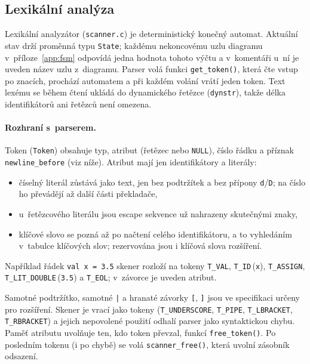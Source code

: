 \subsection{Lexikální analýza}

Lexikální analyzátor (\texttt{scanner.c}) je deterministický konečný automat.
Aktuální stav drží proměnná typu \texttt{State}; každému nekoncovému uzlu
diagramu v~příloze~\ref{app:fsm} odpovídá jedna hodnota tohoto výčtu
a v~komentáři u~ní je uveden název uzlu z~diagramu. Parser volá funkci
\texttt{get\_token()}, která čte vstup po znacích, prochází automatem a při
každém volání vrátí jeden token. Text lexému se během čtení ukládá do
dynamického řetězce (\texttt{dynstr}), takže délka identifikátorů ani
řetězců není omezena.

\paragraph{Rozhraní s~parserem.}
Token (\texttt{Token}) obsahuje typ, atribut (řetězec nebo \texttt{NULL}),
číslo řádku a příznak \texttt{newline\_before} (viz níže). Atribut mají jen
identifikátory a literály:
\begin{itemize}

  \item číselný literál zůstává jako text, jen bez podtržítek a bez přípony
        \texttt{d}/\texttt{D}; na číslo ho převádějí až další části překladače,
  \item u~řetězcového literálu jsou escape sekvence už nahrazeny skutečnými
        znaky,
  \item klíčové slovo se pozná až po načtení celého identifikátoru, a to
        vyhledáním v~tabulce klíčových slov; rezervována jsou i klíčová slova
        rozšíření.
\end{itemize}
Například řádek \texttt{val x = 3.5} skener rozloží na tokeny
\texttt{T\_VAL}, \texttt{T\_ID}\,(\texttt{x}), \texttt{T\_ASSIGN},
\texttt{T\_LIT\_DOUBLE}\,(\texttt{3.5}) a \texttt{T\_EOL};
v~závorce je uveden atribut.

Samotné podtržítko, samotné \texttt{|} a hranaté závorky \texttt{[},
\texttt{]} jsou ve specifikaci určeny pro rozšíření. Skener je vrací jako
tokeny (\texttt{T\_UNDERSCORE}, \texttt{T\_PIPE}, \texttt{T\_LBRACKET},
\texttt{T\_RBRACKET}) a jejich nepovolené použití odhalí parser jako
syntaktickou chybu. Paměť atributu uvolňuje ten, kdo token převzal, funkcí
\texttt{free\_token()}. Po posledním tokenu (i po chybě) se volá
\texttt{scanner\_free()}, která uvolní zásobník odsazení.

